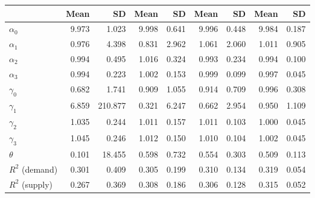 
\begin{tabular}[t]{lrrrrrrrr}
\toprule
  & Mean & SD & Mean  & SD  & Mean   & SD   & Mean    & SD   \\
\midrule
$\alpha_{0}$ & 9.973 & 1.023 & 9.998 & 0.641 & 9.996 & 0.448 & 9.984 & 0.187\\
$\alpha_{1}$ & 0.976 & 4.398 & 0.831 & 2.962 & 1.061 & 2.060 & 1.011 & 0.905\\
$\alpha_{2}$ & 0.994 & 0.495 & 1.016 & 0.324 & 0.993 & 0.234 & 0.994 & 0.100\\
$\alpha_{3}$ & 0.994 & 0.223 & 1.002 & 0.153 & 0.999 & 0.099 & 0.997 & 0.045\\
$\gamma_{0}$ & 0.682 & 1.741 & 0.909 & 1.055 & 0.914 & 0.709 & 0.996 & 0.308\\
$\gamma_{1}$ & 6.859 & 210.877 & 0.321 & 6.247 & 0.662 & 2.954 & 0.950 & 1.109\\
$\gamma_{2}$ & 1.035 & 0.244 & 1.011 & 0.157 & 1.011 & 0.103 & 1.000 & 0.045\\
$\gamma_{3}$ & 1.045 & 0.246 & 1.012 & 0.150 & 1.010 & 0.104 & 1.002 & 0.045\\
$\theta$ & 0.101 & 18.455 & 0.598 & 0.732 & 0.554 & 0.303 & 0.509 & 0.113\\
$R^{2}$ (demand) & 0.301 & 0.409 & 0.305 & 0.199 & 0.310 & 0.134 & 0.319 & 0.054\\
$R^{2}$ (supply) & 0.267 & 0.369 & 0.308 & 0.186 & 0.306 & 0.128 & 0.315 & 0.052\\
\bottomrule
\end{tabular}
